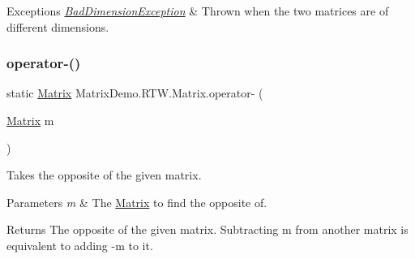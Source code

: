 \begin{DoxyExceptions}{Exceptions}
{\em \mbox{\hyperlink{class_matrix_demo_1_1_r_t_w_1_1_bad_dimension_exception}{Bad\+Dimension\+Exception}}} & Thrown when the two matrices are of different dimensions.\\
\hline
\end{DoxyExceptions}
\mbox{\label{class_matrix_demo_1_1_r_t_w_1_1_matrix_a115c01ce2236a801cfa99bb685aea0ff}} 
\subsubsection{\texorpdfstring{operator-\/()}{operator-()}\hspace{0.1cm}{\footnotesize\ttfamily [2/2]}}
{\footnotesize\ttfamily static \mbox{\hyperlink{class_matrix_demo_1_1_r_t_w_1_1_matrix}{Matrix}} Matrix\+Demo.\+R\+T\+W.\+Matrix.\+operator-\/ (\begin{DoxyParamCaption}\item[{\mbox{\hyperlink{class_matrix_demo_1_1_r_t_w_1_1_matrix}{Matrix}}}]{m }\end{DoxyParamCaption})\hspace{0.3cm}{\ttfamily [static]}}



Takes the opposite of the given matrix. 


\begin{DoxyParams}{Parameters}
{\em m} & The \mbox{\hyperlink{class_matrix_demo_1_1_r_t_w_1_1_matrix}{Matrix}} to find the opposite of.\\
\hline
\end{DoxyParams}
\begin{DoxyReturn}{Returns}
The opposite of the given matrix. Subtracting {\ttfamily m} from another matrix is equivalent to adding {\ttfamily -\/m} to it.
\end{DoxyReturn}
\mbox{\label{class_matrix_demo_1_1_r_t_w_1_1_matrix_a14fc1e8ce8136690364961901e7becf6}} 
